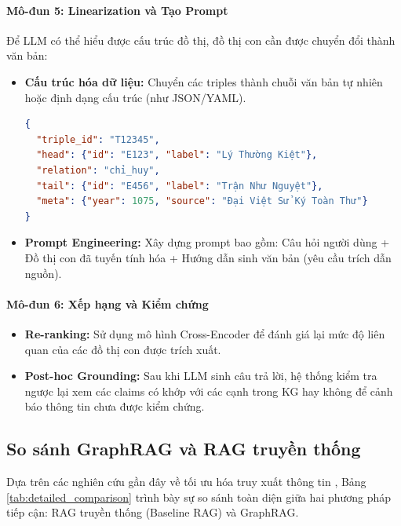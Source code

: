 \paragraph{Mô-đun 5: Linearization và Tạo Prompt}
Để LLM có thể hiểu được cấu trúc đồ thị, đồ thị con cần được chuyển đổi thành văn bản:
\begin{itemize}
    \item \textbf{Cấu trúc hóa dữ liệu:} Chuyển các triples thành chuỗi văn bản tự nhiên hoặc định dạng cấu trúc (như JSON/YAML).
    \begin{lstlisting}[language=json, caption={Ví dụ định dạng JSON cho một Triple lịch sử}]
{
  "triple_id": "T12345",
  "head": {"id": "E123", "label": "Lý Thường Kiệt"},
  "relation": "chỉ_huy",
  "tail": {"id": "E456", "label": "Trận Như Nguyệt"},
  "meta": {"year": 1075, "source": "Đại Việt Sử Ký Toàn Thư"}
}
    \end{lstlisting}
    \item \textbf{Prompt Engineering:} Xây dựng prompt bao gồm: Câu hỏi người dùng + Đồ thị con đã tuyến tính hóa + Hướng dẫn sinh văn bản (yêu cầu trích dẫn nguồn).
\end{itemize}

\paragraph{Mô-đun 6: Xếp hạng và Kiểm chứng}
\begin{itemize}
    \item \textbf{Re-ranking:} Sử dụng mô hình Cross-Encoder để đánh giá lại mức độ liên quan của các đồ thị con được trích xuất.
    \item \textbf{Post-hoc Grounding:} Sau khi LLM sinh câu trả lời, hệ thống kiểm tra ngược lại xem các claims có khớp với các cạnh trong KG hay không để cảnh báo thông tin chưa được kiểm chứng.
\end{itemize}

\subsection{So sánh GraphRAG và RAG truyền thống}

Dựa trên các nghiên cứu gần đây về tối ưu hóa truy xuất thông tin \cite{lewis2020retrieval, edge2024graphrag}, Bảng \ref{tab:detailed_comparison} trình bày sự so sánh toàn diện giữa hai phương pháp tiếp cận: RAG truyền thống (Baseline RAG) và GraphRAG.

